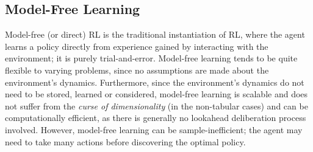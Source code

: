 \subsection{Model-Free Learning}
Model-free (or direct) RL is the traditional instantiation of RL, where the agent learns a policy directly from experience gained by interacting with the environment; it is purely trial-and-error. Model-free learning tends to be quite flexible to varying problems, since no assumptions are made about the environment's dynamics. Furthermore, since the environment's dynamics do not need to be stored, learned or considered, model-free learning is scalable and does not suffer from the \textit{curse of dimensionality} (in the non-tabular cases) and can be computationally efficient, as there is generally no lookahead deliberation process involved. However, model-free learning can be sample-inefficient; the agent may need to take many actions before discovering the optimal policy.
